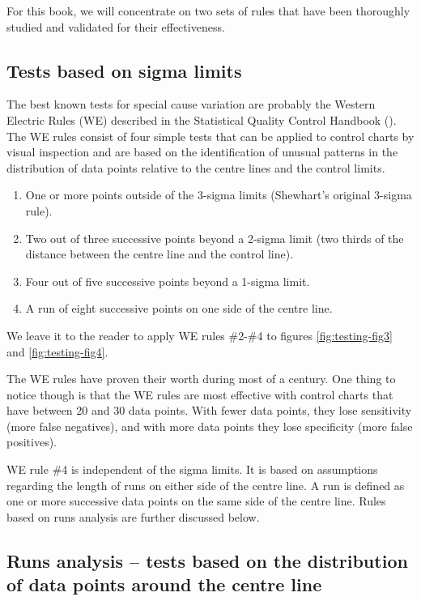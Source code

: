 \documentclass[
]{book}
\begin{document}
For this book, we will concentrate on two sets of rules that have been thoroughly studied and validated for their effectiveness.

\subsection{Tests based on sigma limits}\label{tests-based-on-sigma-limits}

The best known tests for special cause variation are probably the Western Electric Rules (WE) described in the Statistical Quality Control Handbook (). The WE rules consist of four simple tests that can be applied to control charts by visual inspection and are based on the identification of unusual patterns in the distribution of data points relative to the centre lines and the control limits.

\begin{enumerate}
\def\labelenumi{\arabic{enumi}.}
\item
  One or more points outside of the 3-sigma limits (Shewhart's original 3-sigma rule).
\item
  Two out of three successive points beyond a 2-sigma limit (two thirds of the distance between the centre line and the control line).
\item
  Four out of five successive points beyond a 1-sigma limit.
\item
  A run of eight successive points on one side of the centre line.
\end{enumerate}

We leave it to the reader to apply WE rules \#2-\#4 to figures \ref{fig:testing-fig3} and \ref{fig:testing-fig4}.

The WE rules have proven their worth during most of a century. One thing to notice though is that the WE rules are most effective with control charts that have between 20 and 30 data points. With fewer data points, they lose sensitivity (more false negatives), and with more data points they lose specificity (more false positives).

WE rule \#4 is independent of the sigma limits. It is based on assumptions regarding the length of runs on either side of the centre line. A run is defined as one or more successive data points on the same side of the centre line. Rules based on runs analysis are further discussed below.

\subsection{Runs analysis -- tests based on the distribution of data points around the centre line}\label{runs-analysis-tests-based-on-the-distribution-of-data-points-around-the-centre-line}
\end{document}
